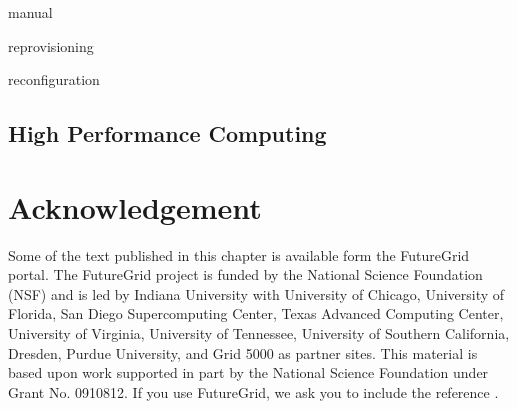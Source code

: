 \documentclass{article}
\begin{document}
manual

reprovisioning

reconfiguration

\subsection{High Performance Computing}







\section*{Acknowledgement}

Some of the text published in this chapter is available form the
FutureGrid portal. The FutureGrid project is funded by the National
Science Foundation (NSF) and is led by Indiana University with
University of Chicago, University of Florida, San Diego Supercomputing
Center, Texas Advanced Computing Center, University of Virginia,
University of Tennessee, University of Southern California, Dresden,
Purdue University, and Grid 5000 as partner sites. This material is
based upon work supported in part by the National Science Foundation
under Grant No. 0910812. If you use FutureGrid, we ask you to include the reference \cite{las2010gce,las12fg-bookchapter}.



\end{document}
